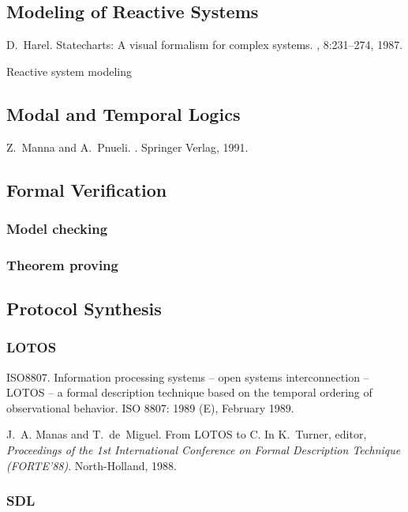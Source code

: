 \documentclass{myproc}
\begin{document}
\subsection{\textcolor{red2}{\bf{}Modeling of Reactive Systems}}
\bit
\w D.~Harel.
\newblock Statecharts: A visual formalism for complex systems.
, 8:231--274, 1987.

\w Reactive system modeling
\eit

\subsection{Modal and Temporal Logics}
\bit
\w Z.~Manna and A.~Pnueli.
.
\newblock Springer Verlag, 1991.
\eit

\subsection{Formal Verification}
\subsubsection{Model checking}
\subsubsection{Theorem proving}

\subsection{\textcolor{red2}{\bf{}Protocol Synthesis}}
\subsubsection{LOTOS}
\bit
\w ISO8807.
\newblock Information processing systems -- open systems interconnection --
  {L}{O}{T}{O}{S} -- a formal description technique based on the temporal
  ordering of observational behavior.
\newblock ISO 8807: 1989 (E), February 1989.

\w 
J.~A. Manas and T.~de~Miguel.
\newblock From {L}{O}{T}{O}{S} to {C}.
\newblock In K.~Turner, editor, {\em Proceedings of the 1st International
  Conference on Formal Description Technique (FORTE'88)}. North-Holland, 1988.

\eit


\subsubsection{SDL}
\end{document}

